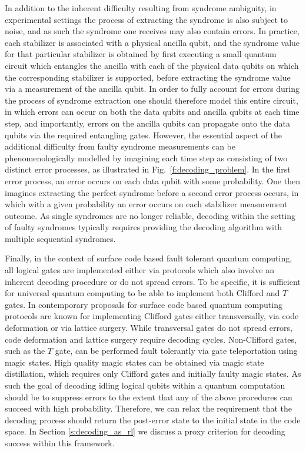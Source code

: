 \documentclass[twocolumn,preprintnumbers,amsmath,amssymb,notitlepage,nofootinbib,longbibliography,superscriptaddress,aps,pra,10pt]{revtex4-1}
\begin{document}
    In addition to the inherent difficulty resulting from syndrome ambiguity, in experimental settings the process of extracting the syndrome is also subject to noise, and as such the syndrome one receives may also contain errors.
    In practice, each stabilizer is associated with a physical ancilla qubit, and the syndrome value for that particular stabilizer is obtained by first executing a small quantum circuit which entangles the ancilla with each of the physical data qubits on which the corresponding stabilizer is supported, before extracting the syndrome value via a measurement of the ancilla qubit.
    In order to fully account for errors during the process of syndrome extraction one should therefore model this entire circuit, in which errors can occur on both the data qubits and ancilla qubits at each time step, and importantly, errors on the ancilla qubits can propagate onto the data qubits via the required entangling gates.
    However, the essential aspect of the additional difficulty from faulty syndrome measurements can be phenomenologically modelled by imagining each time step as consisting of two distinct error processes, as illustrated in Fig.~\ref{f:decoding_problem}.
    In the first error process, an error occurs on each data qubit with some probability.
    One then imagines extracting the perfect syndrome before a second error process occurs, in which with a given probability an error occurs on each stabilizer measurement outcome.
    As single syndromes are no longer reliable, decoding within the setting of faulty syndromes typically requires providing the decoding algorithm with multiple sequential syndromes.

    Finally, in the context of surface code based fault tolerant quantum computing, all logical gates are implemented either via protocols which also involve an inherent decoding procedure or do not spread errors. 
    To be specific, it is sufficient for universal quantum computing to be able to implement both Clifford and $T$ gates.
    In contemporary proposals for surface code based quantum computing protocols are known for implementing Clifford gates either transversally, via code deformation or via lattice surgery.
    While transversal gates do not spread errors, code deformation and lattice surgery require decoding cycles.
    Non-Clifford gates, such as the $T$ gate, can be performed fault tolerantly via gate teleportation using magic states. 
    High quality magic states can be obtained via magic state distillation, which requires only Clifford gates and initially faulty magic states.
    As such the goal of decoding idling logical qubits within a quantum computation should be to suppress errors to the extent that any of the above procedures can succeed with high probability.
    Therefore, we can relax the requirement that the decoding process should return the post-error state to the initial state in the code space.
    In Section \ref{s:decoding_as_rl} we discuss a proxy criterion for decoding success within this framework.
\end{document}
